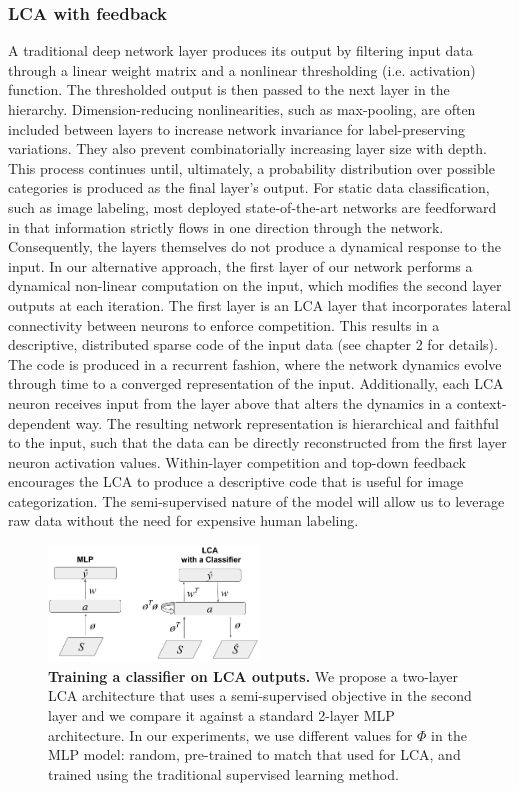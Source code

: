 \subsubsection{LCA with feedback}
A traditional deep network layer produces its output by filtering input data through a linear weight matrix and a nonlinear thresholding (i.e. activation) function.
The thresholded output is then passed to the next layer in the hierarchy.
Dimension-reducing nonlinearities, such as max-pooling, are often included between layers to increase network invariance for label-preserving variations.
They also prevent combinatorially increasing layer size with depth.
This process continues until, ultimately, a probability distribution over possible categories is produced as the final layer’s output.
For static data classification, such as image labeling, most deployed state-of-the-art networks are feedforward in that information strictly flows in one direction through the network.
Consequently, the layers themselves do not produce a dynamical response to the input.
In our alternative approach, the first layer of our network performs a dynamical non-linear computation on the input, which modifies the second layer outputs at each iteration.
The first layer is an LCA layer that incorporates lateral connectivity between neurons to enforce competition.
This results in a descriptive, distributed sparse code of the input data (see chapter 2 for details). %
The code is produced in a recurrent fashion, where the network dynamics evolve through time to a converged representation of the input.
Additionally, each LCA neuron receives input from the layer above that alters the dynamics in a context-dependent way.
The resulting network representation is hierarchical and faithful to the input, such that the data can be directly reconstructed from the first layer neuron activation values.
Within-layer competition and top-down feedback encourages the LCA to produce a descriptive code that is useful for image categorization.
The semi-supervised nature of the model will allow us to leverage raw data without the need for expensive human labeling.

\begin{figure}[h]
    \centering
    \includegraphics[width=0.5\textwidth]{figures/mlp_lcaf_architectures.png}
    \caption{\textbf{Training a classifier on LCA outputs.} We propose a two-layer LCA architecture that uses a semi-supervised objective in the second layer and we compare it against a standard 2-layer MLP architecture. In our experiments, we use different values for $\Phi$ in the MLP model: random, pre-trained to match that used for LCA, and trained using the traditional supervised learning method.}
    \label{fig:ch3_mlp_lcaf_architectures}
\end{figure}

